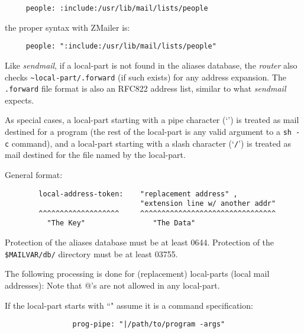 \begin{tscreen}
\begin{verbatim}
     people: :include:/usr/lib/mail/lists/people
\end{verbatim}
\end{tscreen}

the proper syntax with ZMailer is:
\begin{tscreen}
\begin{verbatim}
     people: ":include:/usr/lib/mail/lists/people"
\end{verbatim}
\end{tscreen}


Like {\em sendmail\/}, if a local-part is not found in the aliases database, the
{\em router\/} also checks {\tt \~{}local-part/.forward} (if such exists) for 
any address expansion.  The {\tt .forward} file format is also an RFC822 
address list, similar to what {\em sendmail\/} expects.

As special cases, a local-part starting with a pipe character (`{\tt {\verbar}}') is
treated as mail destined for a program (the rest of the local-part is any
valid argument to a {\tt sh -c} command), and a local-part starting with a
slash character (`{\tt /}') is treated as mail destined for the file named 
by the local-part.

General format:

\begin{tscreen}
\begin{verbatim}
        local-address-token:    "replacement address" ,
                                "extension line w/ another addr"
        ^^^^^^^^^^^^^^^^^^^     ^^^^^^^^^^^^^^^^^^^^^^^^^^^^^^^^
          "The Key"                "The Data"
\end{verbatim}
\end{tscreen}

Protection of the aliases database must be at least 0644.
Protection of the {\tt \$MAILVAR/db/} directory must be at least 03755.



The following processing is done for (replacement) local-parts
(local mail addresses):  Note that @'s are not allowed in any local-part.



If the local-part starts with ``{\verbar}" assume it is a command specification:
\begin{tscreen}
\begin{verbatim}
                prog-pipe: "|/path/to/program -args"
\end{verbatim}
\end{tscreen}

